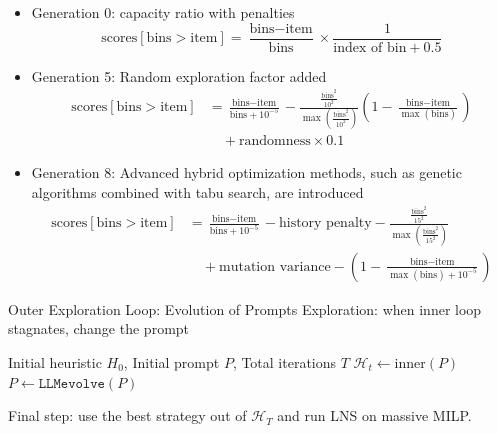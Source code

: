\documentclass{beamer}
\begin{document}
\begin{frame}
	\begin{itemize}
		\item Generation 0: capacity ratio with penalties
		\begin{equation*}
			\text{scores}[\text{bins} > \text{item}] = \frac{\text{bins} - \text{item}}{\text{bins}} \times \frac{1}{\text{index of bin} + 0.5} 
		\end{equation*}
		
		\item Generation 5:  Random exploration factor added
		\begin{align*}
			\text{scores}[\text{bins} > \text{item}] &= \frac{\text{bins} - \text{item}}{\text{bins} + 10^{-5}} - \frac{
				\frac{\text{bins}^2}{10^2}
			}{
				\max\left(\frac{\text{bins}^2}{10^2}\right)
			} \left( 1 - \frac{\text{bins} - \text{item}}{\max(\text{bins})} \right) 
			\\& \quad + \text{randomness} \times 0.1 
		\end{align*}
		
		\item Generation 8: Advanced hybrid optimization methods, such as genetic algorithms combined with tabu search, are introduced
		\begin{align*}
			\text{scores}[\text{bins} > \text{item}] &= \frac{\text{bins} - \text{item}}{\text{bins} + 10^{-5}} - \text{history penalty} - \frac{
				\frac{\text{bins}^2}{15^2}
			}{\max\left(\frac{\text{bins}^2}{15^2}\right)} 
			\\& \quad + \text{mutation variance} - \left( 1 - \frac{\text{bins} - \text{item}}{\max(\text{bins}) + 10^{-5}} \right) 
		\end{align*}
	\end{itemize}
\end{frame}
\begin{frame}{Outer Exploration Loop: Evolution of Prompts}
	\vskip -2mm
	Exploration: when inner loop stagnates, change the prompt
	\vskip 3mm
	\centering
	
	\begin{algorithm}[H]
		\caption{Outer loop for exploration}
		\begin{algorithmic}[1] %
			\Require Initial heuristic $H_0$, Initial prompt $P$, Total iterations $T$
			\State $\mathcal{H}_{t} \gets \text{inner}(P)$
			\State $P \gets \texttt{LLMevolve}(P)$
			\EndIf
			\EndFor
		\end{algorithmic}
	\end{algorithm}
	
Final step: use the best strategy out of $\mathcal{H}_T$ and run LNS on massive MILP.	
\end{frame}
\end{document}
